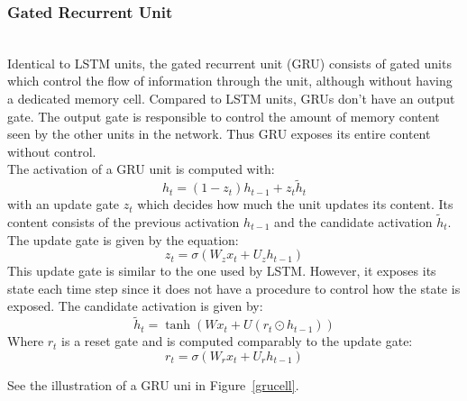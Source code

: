 
\subsubsection{Gated Recurrent Unit}~\\

Identical to LSTM units, the gated recurrent unit (GRU) consists of gated units
which control the flow of information through the unit, although without having
a dedicated memory cell. Compared to LSTM units, GRUs don't have an output gate.
The output gate is responsible to control the amount of memory content seen by
the other units in the network. Thus GRU exposes its entire content without
control.~\cite{DBLP:journals/corr/ChungGCB14}\\

The activation of a GRU unit is computed with:
\begin{equation}
  h_t = (1-z_t)h_{t-1} + z_t\tilde{h}_t
\end{equation}
with an update gate $z_t$ which decides how much the unit updates its content.
Its content consists of the previous activation $h_{t-1}$ and the candidate
activation $\tilde{h}_t$. The update gate is given by the equation:
\begin{equation}
  z_t=\sigma(W_z x_t+U_z h_{t-1}) 
\end{equation}
This update gate is similar to the one used by LSTM. However, it exposes its
state each time step since it does not have a procedure to control how the state
is exposed. The candidate activation is given by:
\begin{equation}
  \tilde{h}_t=\tanh(Wx_t+U(r_t\odot h_{t-1}))
\end{equation}
Where $r_t$ is a reset gate and is computed comparably to the update gate:
\begin{equation}
  r_t=\sigma(W_r x_t+U_r h_{t-1})
\end{equation}

See the illustration of a GRU uni in Figure~\ref{grucell}.


